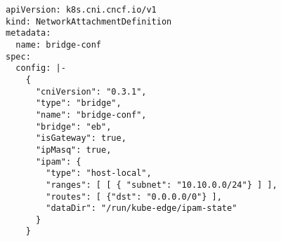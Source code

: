 \begin{lstfloat}
\begin{lstlisting}[style=mybashstyle,
caption={Ukázka konfigurace Network Attachment Definition},
label={sample:nad}
]
apiVersion: k8s.cni.cncf.io/v1
kind: NetworkAttachmentDefinition
metadata:
  name: bridge-conf
spec:
  config: |-
    {
      "cniVersion": "0.3.1",
      "type": "bridge",
      "name": "bridge-conf",
      "bridge": "eb",
      "isGateway": true,
      "ipMasq": true,
      "ipam": {
        "type": "host-local",
        "ranges": [ [ { "subnet": "10.10.0.0/24"} ] ],
        "routes": [ {"dst": "0.0.0.0/0"} ],
        "dataDir": "/run/kube-edge/ipam-state"
      }
    }
\end{lstlisting}
\end{lstfloat}
